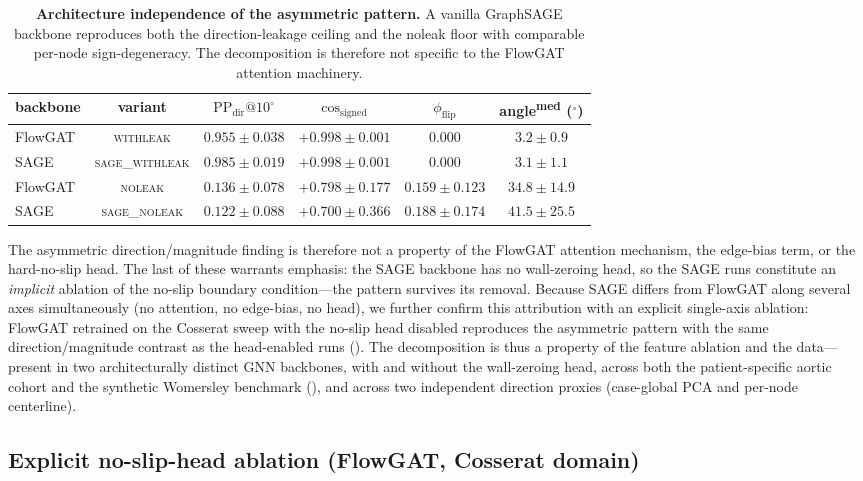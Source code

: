 \documentclass[10pt,a4paper]{article}
\makeatletter
\newcommand{\withleak}{\textsc{withleak}}
\newcommand{\noleak}{\textsc{noleak}}
\newcommand{\sagewithleak}{\textsc{sage\_withleak}}
\newcommand{\sagenoleak}{\textsc{sage\_noleak}}
\newcommand{\PPdir}[1]{\mathrm{PP_{dir}}@#1^\circ}
\newcommand{\cosgn}{\mathrm{cos}_\mathrm{signed}}
\newcommand{\fracflip}{\phi_\mathrm{flip}}
\makeatother
\begin{document}
\begin{table}[h]
\centering
\small
\begin{tabular}{lccccc}
\toprule
backbone & variant & $\PPdir{10}$ & $\cosgn$ & $\fracflip$ & angle\textsuperscript{med} ($^\circ$) \\
\midrule
FlowGAT & \withleak{} & $0.955 \pm 0.038$ & $+0.998 \pm 0.001$ & $0.000$ & $3.2 \pm 0.9$ \\
SAGE    & \sagewithleak{} & $0.985 \pm 0.019$ & $+0.998 \pm 0.001$ & $0.000$ & $3.1 \pm 1.1$ \\
\midrule
FlowGAT & \noleak{} & $0.136 \pm 0.078$ & $+0.798 \pm 0.177$ & $0.159 \pm 0.123$ & $34.8 \pm 14.9$ \\
SAGE    & \sagenoleak{} & $0.122 \pm 0.088$ & $+0.700 \pm 0.366$ & $0.188 \pm 0.174$ & $41.5 \pm 25.5$ \\
\bottomrule
\end{tabular}
\caption{\textbf{Architecture independence of the asymmetric pattern.}
A vanilla GraphSAGE backbone reproduces both the direction-leakage
ceiling and the noleak floor with comparable per-node
sign-degeneracy. The decomposition is therefore not specific to the
FlowGAT attention machinery.}
\label{tab:sage_compare}
\end{table}

The asymmetric direction/magnitude finding is therefore not a
property of the FlowGAT attention mechanism, the edge-bias term,
or the hard-no-slip head. The last of these warrants emphasis:
the SAGE backbone has no wall-zeroing head, so the SAGE runs
constitute an \emph{implicit} ablation of the no-slip boundary
condition---the pattern survives its removal. Because SAGE
differs from FlowGAT along several axes simultaneously (no
attention, no edge-bias, no head), we further confirm this
attribution with an explicit single-axis ablation: FlowGAT
retrained on the Cosserat sweep with the no-slip head disabled
reproduces the asymmetric pattern with the same direction/magnitude
contrast as the head-enabled runs ().
The decomposition is thus a property of the feature ablation
and the data---present in two architecturally distinct GNN
backbones, with and without the wall-zeroing head, across both
the patient-specific aortic cohort and the synthetic Womersley
benchmark (), and across two independent
direction proxies (case-global PCA and per-node centerline).

\subsection*{Explicit no-slip-head ablation (FlowGAT, Cosserat domain)}
\label{sec:nobc_ablation}
\end{document}

